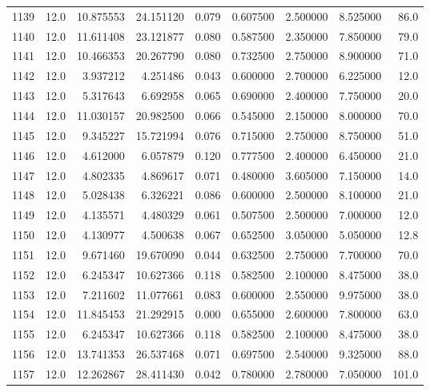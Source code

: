 \begin{tabular}{lrrrrrrrr}
1139 &   12.0 &  10.875553 &  24.151120 &  0.079 &  0.607500 &  2.500000 &   8.525000 &   86.0 \\
1140 &   12.0 &  11.611408 &  23.121877 &  0.080 &  0.587500 &  2.350000 &   7.850000 &   79.0 \\
1141 &   12.0 &  10.466353 &  20.267790 &  0.080 &  0.732500 &  2.750000 &   8.900000 &   71.0 \\
1142 &   12.0 &   3.937212 &   4.251486 &  0.043 &  0.600000 &  2.700000 &   6.225000 &   12.0 \\
1143 &   12.0 &   5.317643 &   6.692958 &  0.065 &  0.690000 &  2.400000 &   7.750000 &   20.0 \\
1144 &   12.0 &  11.030157 &  20.982500 &  0.066 &  0.545000 &  2.150000 &   8.000000 &   70.0 \\
1145 &   12.0 &   9.345227 &  15.721994 &  0.076 &  0.715000 &  2.750000 &   8.750000 &   51.0 \\
1146 &   12.0 &   4.612000 &   6.057879 &  0.120 &  0.777500 &  2.400000 &   6.450000 &   21.0 \\
1147 &   12.0 &   4.802335 &   4.869617 &  0.071 &  0.480000 &  3.605000 &   7.150000 &   14.0 \\
1148 &   12.0 &   5.028438 &   6.326221 &  0.086 &  0.600000 &  2.500000 &   8.100000 &   21.0 \\
1149 &   12.0 &   4.135571 &   4.480329 &  0.061 &  0.507500 &  2.500000 &   7.000000 &   12.0 \\
1150 &   12.0 &   4.130977 &   4.500638 &  0.067 &  0.652500 &  3.050000 &   5.050000 &   12.8 \\
1151 &   12.0 &   9.671460 &  19.670090 &  0.044 &  0.632500 &  2.750000 &   7.700000 &   70.0 \\
1152 &   12.0 &   6.245347 &  10.627366 &  0.118 &  0.582500 &  2.100000 &   8.475000 &   38.0 \\
1153 &   12.0 &   7.211602 &  11.077661 &  0.083 &  0.600000 &  2.550000 &   9.975000 &   38.0 \\
1154 &   12.0 &  11.845453 &  21.292915 &  0.000 &  0.655000 &  2.600000 &   7.800000 &   63.0 \\
1155 &   12.0 &   6.245347 &  10.627366 &  0.118 &  0.582500 &  2.100000 &   8.475000 &   38.0 \\
1156 &   12.0 &  13.741353 &  26.537468 &  0.071 &  0.697500 &  2.540000 &   9.325000 &   88.0 \\
1157 &   12.0 &  12.262867 &  28.411430 &  0.042 &  0.780000 &  2.780000 &   7.050000 &  101.0 \\

\end{tabular}
